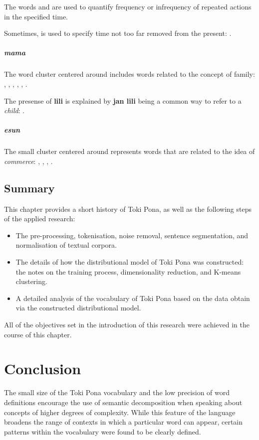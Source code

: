 \documentclass[14pt, a4paper]{extreport}
\begin{document}
The words  and  are used to quantify frequency or infrequency of repeated actions in the specified time.

Sometimes,  is used to specify time not too far removed from the present: .
      \paragraph{mama}
The word cluster centered around  includes words related to the concept of family: , , , , , .

The presense of \textbf{lili} is explained by \textbf{jan lili} being a common way to refer to a \textit{child}: .
      \paragraph{esun}
The small cluster centered around  represents words that are related to the idea of \textit{commerce}: , , , .

  \section{Summary}

This chapter provides a short history of Toki Pona, as well as the following steps of the applied research:

\begin{itemize}
  \item The pre-processing, tokenisation, noise removal, sentence segmentation, and normalisation of textual corpora.
  \item The details of how the distributional model of Toki Pona was constructed: the notes on the training process, dimensionality reduction, and K-means clustering.
  \item A detailed analysis of the vocabulary of Toki Pona based on the data obtain via the constructed distributional model.
\end{itemize}

All of the objectives set in the introduction of this research were achieved in the course of this chapter.

\chapter{Conclusion}
The small size of the Toki Pona vocabulary and the low precision of word definitions encourage the use of semantic decomposition when speaking about concepts of higher degrees of complexity. While this feature of the language broadens the range of contexts in which a particular word can appear, certain patterns within the vocabulary were found to be clearly defined.
\end{document}
